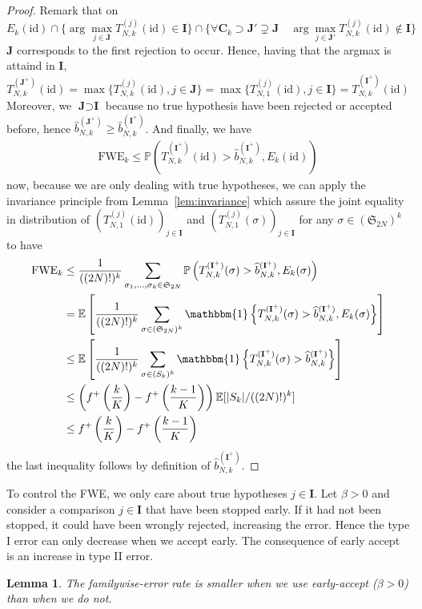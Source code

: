 \documentclass{article}
\theoremstyle{plain}
\newtheorem{Lemma}{Lemma}
\theoremstyle{remark}
\renewcommand{\P}{\mathbb{P}}
\newcommand{\E}{\mathbb{E}}
\renewcommand{\S}{\mathfrak{S}}
\newcommand{\1}{\mathbbm{1}}
\newcommand{\id}{\mathrm{id}}
\numberwithin{equation}{section}
\begin{document}
\begin{proof}
Remark that on $$E_k(\id) \cap \{\arg\max_{j \in \textbf{J}}T_{N,k}^{(j)}(\id) \in \textbf{I}\}\cap\{ \forall \textbf{C}_k \supset \textbf{J}'\supsetneq\textbf{J} \quad  \arg\max_{j \in \textbf{J}'}T_{N,k}^{(j)}(\id) \notin \textbf{I}\}  $$
$\textbf{J}$ corresponds to the first rejection to occur. Hence, having that the argmax is attaind in $\textbf{I}$,
$$T_{N,k}^{(\textbf{J}^+)}(\id)= \max\{T_{N,k}^{(j)}(\id), j \in \textbf{J}\} = \max\{T_{N,1}^{(j)}(\id), j \in \textbf{I}\} = T_{N,k}^{(\textbf{I}^+)}(\id)$$
Moreover, we $\textbf{J} \supset \textbf{I}$ because no true hypothesis have been rejected or accepted before, hence $\widehat{b}_{N,k}^{(\textbf{J}^+)} \ge \widehat{b}_{N,k}^{(\textbf{I}^+)}$. And finally, we have 
\begin{align*}
\mathrm{FWE}_k\le \P\left( T_{N,k}^{(\textbf{I}^+)}(\id) > \widehat{b}_{N,k}^{(\textbf{I}^+)}, E_k(\id) \right)
\end{align*}
now, because we are only dealing with true hypotheses, we can apply the invariance principle from Lemma~\ref{lem:invariance} which assure the joint equality in distribution of $(T_{N,1}^{(j)}(\id))_{j \in \textbf{I}}$ and $( T_{N,1}^{(j)}(\sigma))_{j \in \textbf{I}}$ for any $\sigma \in (\S_{2N})^k$ to have
\begin{align*}
\mathrm{FWE}_k &\le \frac{1}{((2N)!)^k}\sum_{\sigma_1,\dots,\sigma_k \in \S_{2N}}\P\left( T_{N,k}^{(\textbf{I}^+)}(\sigma) > \widehat{b}_{N,k}^{(\textbf{I}^+)}, E_k(\sigma) \right)\\
&= \E\left[\frac{1}{((2N)!)^k}\sum_{\sigma \in (\S_{2N})^k}\1\left\{ T_{N,k}^{(\textbf{I}^+)}(\sigma) > \widehat{b}_{N,k}^{(\textbf{I}^+)}, E_k(\sigma)\right\} \right]\\
&\le \E\left[\frac{1}{((2N)!)^k}\sum_{\sigma \in (S_k)^k}\1\left\{ T_{N,k}^{(\textbf{I}^+)}(\sigma) > \widehat{b}_{N,k}^{(\textbf{I}^+)}\right\} \right]\\
&\le \left(f^+\left(\frac{k}{K}\right)-f^+\left(\frac{k-1}{K}\right)\right)\E[|S_k|/((2N)!)^k]\\
&\le f^+\left(\frac{k}{K}\right)-f^+\left(\frac{k-1}{K}\right)
\end{align*}
the last inequality follows by definition of $\widehat{b}_{N,k}^{(\textbf{I}^+)}$.
\end{proof}
To control the FWE, we only care about true hypotheses $j \in \textbf{I}$. Let $\beta>0$ and consider a comparison $j \in \textbf{I}$ that have been stopped early. If it had not been stopped, it could have been wrongly rejected, increasing the error. Hence the type I error can only decrease when we accept early. The consequence of early accept is an increase in type II error.
\begin{Lemma}
The familywise-error rate is smaller when we use early-accept ($\beta>0$) than when we do not.
\end{Lemma}
\end{document}
